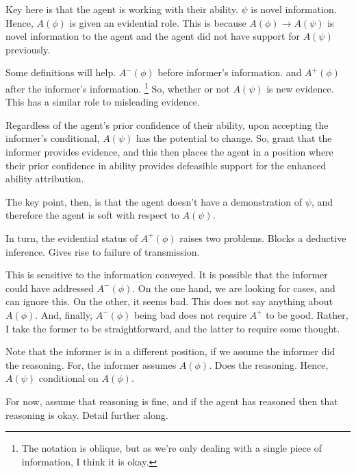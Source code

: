 \documentclass[10pt]{article}
\begin{document}
\begin{note}
Key here is that the agent is working with their ability.
\(\psi\) is novel information.
Hence, \(A(\phi)\) is given an evidential role.
This is because \(A(\phi) \rightarrow A(\psi)\) is novel information to the agent and the agent did not have support for \(A(\psi)\) previously.

Some definitions will help.
\(A^{-}(\phi)\) before informer's information.
and
\(A^{+}(\phi)\) after the informer's information.\nolinebreak
\footnote{
  The notation is oblique, but as we're only dealing with a single piece of information, I think it is okay.
}
So, whether or not \(A(\psi)\) is new evidence.
This has a similar role to misleading evidence.

Regardless of the agent's prior confidence of their ability, upon accepting the informer's conditional, \(A(\psi)\) has the potential to change.
So, grant that the informer provides evidence, and this then places the agent in a position where their prior confidence in ability provides defeasible support for the enhanced ability attribution.

The key point, then, is that the agent doesn't have a demonstration of \(\psi\), and therefore the agent is soft with respect to \(A(\psi)\).

In turn, the evidential status of \(A^{+}(\phi)\) raises two problems.
Blocks a deductive inference.
Gives rise to failure of transmission.

This is sensitive to the information conveyed.
It is possible that the informer could have addressed \(A^{-}(\phi)\).
On the one hand, we are looking for cases, and can ignore this.
On the other, it seems bad.
This does not say anything about \(A(\phi)\).
And, finally, \(A^{-}(\phi)\) being bad does not require \(A^{+}\) to be good.
Rather, I take the former to be straightforward, and the latter to require some thought.
\end{note}

\begin{note}
  Note that the informer is in a different position, if we assume the informer did the reasoning.
  For, the informer assumes \(A(\phi)\).
  Does the reasoning.
  Hence, \(A(\psi)\) conditional on \(A(\phi)\).

  For now, assume that reasoning is fine, and if the agent has reasoned then that reasoning is okay.
  Detail further along.
\end{note}
\end{document}
